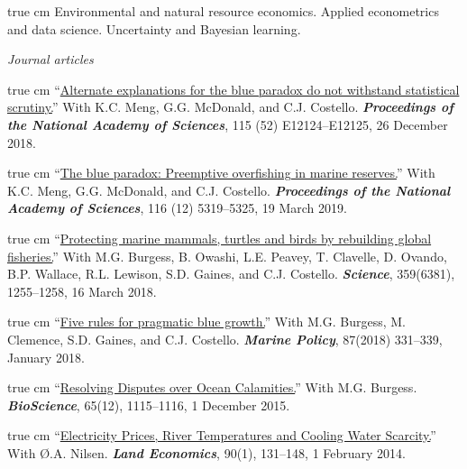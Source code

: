 \documentclass[10pt]{article}
\def\ind{\hangindent=1 true cm \hangafter=1 \vspace{.5em} \noindent}
\newcommand{\blankline}{\quad\pagebreak[3]}
\begin{document}
\ind Environmental and natural resource economics. Applied econometrics and data science. Uncertainty and Bayesian learning.

\blankline

\emph{Journal articles}

\ind ``\href{https://doi.org/10.1073/pnas.1818687115}{Alternate explanations for the blue paradox do not withstand statistical scrutiny.}'' With K.C. Meng, G.G. McDonald, and C.J. Costello. \textit{\textbf{Proceedings of the National Academy of Sciences}}, 115 (52) E12124--E12125, 26 December 2018.

\ind ``\href{http://dx.doi.org/10.1073/pnas.1802862115}{The blue paradox: Preemptive overfishing in marine reserves.}'' With K.C. Meng, G.G. McDonald, and C.J. Costello. \textit{\textbf{Proceedings of the National Academy of Sciences}}, 116 (12) 5319--5325, 19 March 2019.

\ind ``\href{http://dx.doi.org/10.1126/science.aao4248}{Protecting marine mammals, turtles and birds by rebuilding global fisheries.}'' With M.G. Burgess, B. Owashi, L.E. Peavey, T. Clavelle, D. Ovando, B.P. Wallace, R.L. Lewison, S.D. Gaines, and C.J. Costello.
\textit{\textbf{Science}}, 359(6381), 1255--1258, 16 March 2018.


\ind ``\href{http://dx.doi.org/10.1016/j.marpol.2016.12.005}{Five rules for pragmatic blue growth.}'' With %
M.G. Burgess, M. Clemence, S.D. Gaines, and C.J. Costello.
\textbf{\textit{Marine Policy}}, 87(2018) 331--339, January 2018.

\ind  ``\href{http://dx.doi.org/10.1093/biosci/biv147}{Resolving Disputes over Ocean Calamities.}'' With M.G. Burgess. \textbf{\textit{BioScience}}, 65(12), 1115--1116, 1 December 2015.

\ind  ``\href{http://dx.doi.org/10.3368/le.90.1.131}{Electricity Prices, River Temperatures and Cooling Water Scarcity.}'' With \O.A. Nilsen. \textbf{\textit{Land Economics}}, 90(1), 131--148, 1 February 2014.

%    
\end{document}
